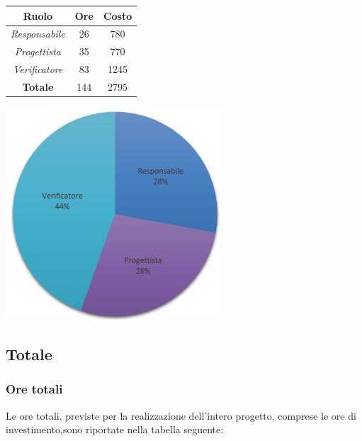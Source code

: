 \begin{center}
  \centering
  \begin{tabular}{|c|c|c|}
    \hline
    \textbf{Ruolo} & \textbf{Ore} & \textbf{Costo} \\
    \hline
     \emph{Responsabile}  & 26 & 780 \\
    \hline  \emph{Progettista}  & 35 & 770 \\
    \hline  \emph{Verificatore}  & 83 & 1245 \\
    \hline
    \textbf{Totale} & 144 & 2795 \\
    \hline
  \end{tabular}
  \includegraphics[scale=0.7]{img/6-Validazione.png}
\end{center}

\subsection{Totale}
\subsubsection{Ore totali}
Le ore totali, previste per la realizzazione dell'intero progetto, comprese le ore di investimento,sono riportate nella tabella seguente: \\ \\

